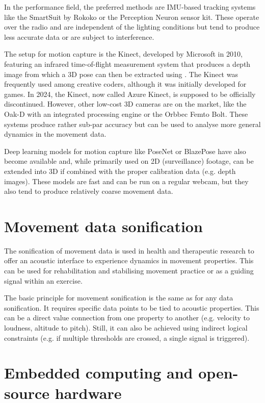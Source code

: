 In the performance field, the preferred methods are IMU-based tracking systems like the SmartSuit by Rokoko or the Perception Neuron sensor kit. These operate over the radio and are independent of the lighting conditions but tend to produce less accurate data or are subject to interference.

The  setup for motion capture is the Kinect, developed by Microsoft in 2010, featuring an infrared time-of-flight measurement system that produces a depth image from which a 3D pose can then be extracted using . The Kinect was frequently used among creative coders, although it was initially developed for games. In 2024, the Kinect, now called Azure Kinect, is supposed to be officially discontinued. However, other low-cost 3D cameras are on the market, like the Oak-D with an integrated processing engine or the Orbbec Femto Bolt. These systems produce rather sub-par accuracy but can be used to analyse more general dynamics in the movement data.

Deep learning models for motion capture like PoseNet or BlazePose have also become available and, while primarily used on 2D (surveillance) footage, can be extended into 3D if combined with the proper calibration data (e.g. depth images). These models are fast and can be run on a regular webcam, but they also tend to produce relatively coarse movement data.

\section{Movement data sonification}

The sonification of movement data is used in health and therapeutic research to offer an acoustic interface to experience dynamics in movement properties. This can be used for rehabilitation and stabilising movement practice or as a guiding signal within an exercise.

The basic principle for movement sonification is the same as for any data sonification. It requires specific data points to be tied to acoustic properties. This can be a direct value connection from one property to another (e.g. velocity to loudness, altitude to pitch). Still, it can also be achieved using indirect logical constraints (e.g. if multiple thresholds are crossed, a single signal is triggered).


\section{Embedded computing and open-source hardware}

